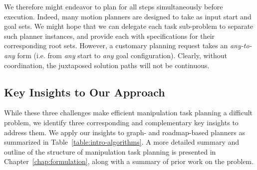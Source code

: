 We therefore might endeavor to plan for all steps
simultaneously before execution.
Indeed,
many motion planners are designed to take as input
start and goal sets.
We might hope that we can delegate each task sub-problem to
separate such planner instances,
and provide each with specifications for their corresponding
root sets.
However,
a customary planning request takes an \emph{any-to-any} form
(i.e. from \emph{any} start to \emph{any} goal configuration).
Clearly, without coordination,
the juxtaposed solution paths will not be continuous.

\subsection*{Key Insights to Our Approach}

While these three challenges make efficient
manipulation task planning a difficult problem,
we identify three corresponding and complementary
key insights to address them.
We apply our insights to graph- and roadmap-based planners
as summarized in Table~\ref{table:intro-algorithms}.
A more detailed summary and outline of the structure of
manipulation task planning is presented in
Chapter~\ref{chap:formulation},
along with a summary of prior work on the problem.

